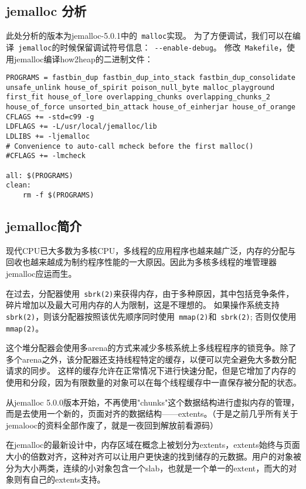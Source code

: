 \begin{center}
    \section{jemalloc 分析}
\end{center}

\setlength{\parindent}{2em}
此处分析的版本为jemalloc-5.0.1中的\verb+ malloc+实现。
为了方便调试，我们可以在编译\verb+ jemalloc+的时候保留调试符号信息：\verb+ --enable-debug+。
修改\verb+ Makefile+，使用jemalloc编译how2heap的二进制文件：
\begin{verbatim}
PROGRAMS = fastbin_dup fastbin_dup_into_stack fastbin_dup_consolidate unsafe_unlink house_of_spirit poison_null_byte malloc_playground first_fit house_of_lore overlapping_chunks overlapping_chunks_2 house_of_force unsorted_bin_attack house_of_einherjar house_of_orange
CFLAGS += -std=c99 -g
LDFLAGS += -L/usr/local/jemalloc/lib
LDLIBS += -ljemalloc
# Convenience to auto-call mcheck before the first malloc()
#CFLAGS += -lmcheck

all: $(PROGRAMS)
clean:
    rm -f $(PROGRAMS)
\end{verbatim}

\subsection{jemalloc简介}

现代CPU已大多数为多核CPU，多线程的应用程序也越来越广泛，内存的分配与回收也越来越成为制约程序性能的一大原因。因此为多核多线程的堆管理器jemalloc应运而生。

在过去，分配器使用\verb+ sbrk(2)+来获得内存，由于多种原因，其中包括竞争条件，碎片增加以及最大可用内存的人为限制，这是不理想的。 如果操作系统支持\verb+ sbrk(2)+，则该分配器按照该优先顺序同时使用\verb+ mmap(2)+和\verb+ sbrk(2)+; 否则仅使用\verb+ mmap(2)+。

这个堆分配器会使用多arena的方式来减少多核系统上多线程程序的锁竞争。除了多个arena之外，该分配器还支持线程特定的缓存，以便可以完全避免大多数分配请求的同步。 这样的缓存允许在正常情况下进行快速分配，但是它增加了内存的使用和分段，因为有限数量的对象可以在每个线程缓存中一直保存被分配的状态。

从jemalloc 5.0.0版本开始，不再使用"chunks"这个数据结构进行虚拟内存的管理，而是去使用一个新的，页面对齐的数据结构——extents。（于是之前几乎所有关于jemalooc的资料全部作废了，就是一夜回到解放前看源码）

在jemalloc的最新设计中，内存区域在概念上被划分为extents，extents始终与页面大小的倍数对齐，这种对齐可以让用户更快速的找到储存的元数据。用户的对象被分为大小两类，连续的小对象包含一个slab，也就是一个单一的extent，而大的对象则有自己的extents支持。

